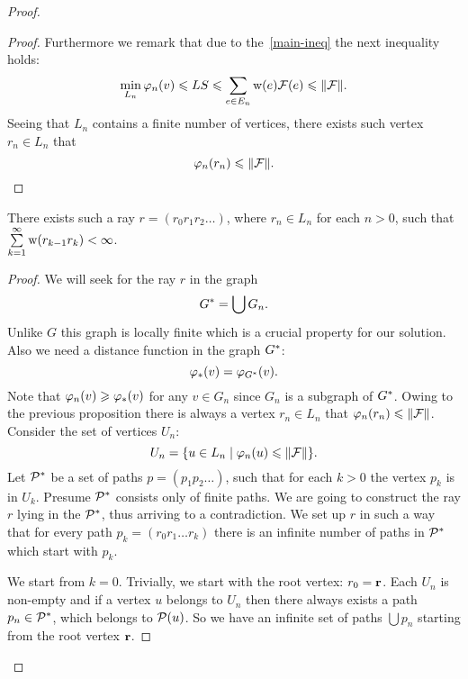 \documentclass[12pt]{amsart}
\begin{document}
\begin{proof}
\begin{proof}
        Furthermore we remark that due to the~\eqref{main-ineq} the next inequality holds:
        \[
          \min_{L_n} \phi_n(v) \leq LS \leq \sum_{e \in E_n} \wtp(e) \flowpos(e) \leq \|\flowpos\|.
        \]
        Seeing that $L_n$ contains a finite number of vertices, there exists such vertex $r_n \in L_n$ that
        \[
          \phi_n(r_n) \leq \|\flowpos\|.
        \]
      \end{proof}
      \begin{prop}
        There exists such a ray $r=(r_0 r_1 r_2\dots)$, where $r_n \in L_n$ for each $n > 0$, such that $\sum\limits_{k=1}^\infty \wtp(r_{k-1}r_k) < \infty$.
      \end{prop}
      \begin{proof}
        We will seek for the ray $r$ in the graph
        \[
          \gstar = \bigcup G_n.
        \]
        Unlike $G$ this graph is locally finite which is a crucial property for our solution.
        Also we need a distance function in the graph $\gstar$:
        \[
          \phistar(v)=\phi_{\gstar}(v).
        \]
        Note that $\phi_n(v) \geq \phistar(v)$ for any $v \in G_n$ since $G_n$ is a subgraph of $\gstar$.
        Owing to the previous proposition there is always a vertex $r_n \in L_n$ that $\phi_n(r_n) \leq \|\flowpos\|$.
        Consider the set of vertices $U_n$:
        \[
          U_n= \{u \in L_n \mid \phi_n(u) \leq \|\flowpos\|\}.
        \]
        Let $\cal{P}^*$ be a set of paths $p = (p_1 p_2 \dots)$, such that for each $k > 0$ the vertex $p_k$ is in $U_k$.
        Presume $\cal{P}^*$ consists only of finite paths.
        We are going to construct the ray $r$ lying in the $\cal{P}^*$, thus arriving to a contradiction.
        We set up $r$ in such a way that for every path $p_k= (r_0 r_1 \dots r_k)$ there is an infinite number of paths
          in $\cal{P}^*$ which start with $p_k$.

        We start from $k = 0$.
        Trivially, we start with the root vertex: $r_0 = \root$.
        Each $U_n$ is non-empty and if a vertex $u$ belongs to $U_n$ then there always exists
          a path $p_n \in \cal{P}^*$, which belongs to $\cal{P}(u)$.
        So we have an infinite set of paths $\bigcup p_n$ starting from the root vertex $\root$.


\end{proof}
\end{proof}
\end{document}
